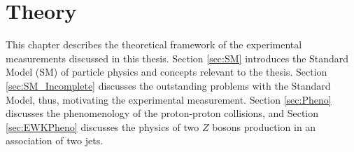 \part{\LARGE{Theory}}
\label{sec:theory}

This chapter describes the theoretical framework of the experimental measurements discussed in this thesis. Section  \ref{sec:SM} introduces the Standard Model (SM) of particle physics and concepts relevant to the thesis. Section \ref{sec:SM_Incomplete} discusses the outstanding problems with the Standard Model, thus, motivating the experimental measurement. Section \ref{sec:Pheno} discusses the phenomenology of the proton-proton collisions, and Section \ref{sec:EWKPheno} discusses the physics of two $Z$ bosons production in an association of two jets. 